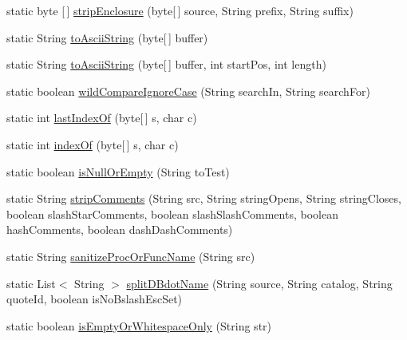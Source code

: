 \begin{DoxyCompactItemize}
\item 
static byte \mbox{[}$\,$\mbox{]} \mbox{\hyperlink{classcom_1_1mysql_1_1cj_1_1util_1_1_string_utils_a4ce78d0db6bb767b84a604d8c41f4450}{strip\+Enclosure}} (byte\mbox{[}$\,$\mbox{]} source, String prefix, String suffix)
\item 
static String \mbox{\hyperlink{classcom_1_1mysql_1_1cj_1_1util_1_1_string_utils_ab4259729318332e6bffcd39100e499aa}{to\+Ascii\+String}} (byte\mbox{[}$\,$\mbox{]} buffer)
\item 
static String \mbox{\hyperlink{classcom_1_1mysql_1_1cj_1_1util_1_1_string_utils_a304c08b0fb33f8644e7a335315620be4}{to\+Ascii\+String}} (byte\mbox{[}$\,$\mbox{]} buffer, int start\+Pos, int length)
\item 
static boolean \mbox{\hyperlink{classcom_1_1mysql_1_1cj_1_1util_1_1_string_utils_aeb82746eacaf9c0a68d1aae01c8719c3}{wild\+Compare\+Ignore\+Case}} (String search\+In, String search\+For)
\item 
static int \mbox{\hyperlink{classcom_1_1mysql_1_1cj_1_1util_1_1_string_utils_a6eaaf0103913b8b7a82858ae20acf001}{last\+Index\+Of}} (byte\mbox{[}$\,$\mbox{]} s, char c)
\item 
static int \mbox{\hyperlink{classcom_1_1mysql_1_1cj_1_1util_1_1_string_utils_aabc7d8d476e741e26b48c2e73a7d35c5}{index\+Of}} (byte\mbox{[}$\,$\mbox{]} s, char c)
\item 
static boolean \mbox{\hyperlink{classcom_1_1mysql_1_1cj_1_1util_1_1_string_utils_a10a2950c2079e853d170db95ea0b800c}{is\+Null\+Or\+Empty}} (String to\+Test)
\item 
static String \mbox{\hyperlink{classcom_1_1mysql_1_1cj_1_1util_1_1_string_utils_a116f3a40fdeca32a4e97256d471ff31a}{strip\+Comments}} (String src, String string\+Opens, String string\+Closes, boolean slash\+Star\+Comments, boolean slash\+Slash\+Comments, boolean hash\+Comments, boolean dash\+Dash\+Comments)
\item 
static String \mbox{\hyperlink{classcom_1_1mysql_1_1cj_1_1util_1_1_string_utils_a465f0e5c11f81ab8aab8913e9a3f4e4d}{sanitize\+Proc\+Or\+Func\+Name}} (String src)
\item 
static List$<$ String $>$ \mbox{\hyperlink{classcom_1_1mysql_1_1cj_1_1util_1_1_string_utils_a7070f6928c8a88a95474c4462c6ff8a8}{split\+D\+Bdot\+Name}} (String source, String catalog, String quote\+Id, boolean is\+No\+Bslash\+Esc\+Set)
\item 
static boolean \mbox{\hyperlink{classcom_1_1mysql_1_1cj_1_1util_1_1_string_utils_a646806a5c4912bb96f50359f64bfb6b7}{is\+Empty\+Or\+Whitespace\+Only}} (String str)

\end{DoxyCompactItemize}
